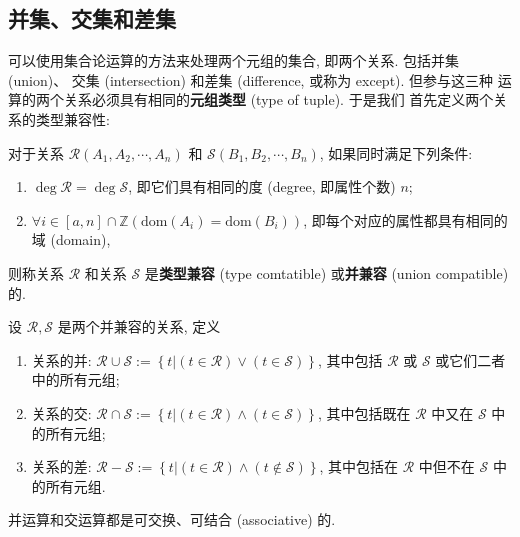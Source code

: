 \documentclass[10pt,UTF8]{book} %
\begin{document}
\subsection{并集、交集和差集}

可以使用集合论运算的方法来处理两个元组的集合, 即两个关系. 包括并集 (union)、
交集 (intersection) 和差集 (difference, 或称为 except). 但参与这三种
运算的两个关系必须具有相同的\textbf{元组类型} (type of tuple). 于是我们
首先定义两个关系的类型兼容性:

\begin{definition}
    对于关系 $\mathcal{R}(A_1, A_2, \cdots, A_n)$ 和 $\mathcal{S}
    (B_1, B_2, \cdots, B_n)$, 如果同时满足下列条件:
    \begin{enumerate}[label={${\arabic*}^\circ$}, itemsep=0pt]
        \item $\deg \mathcal{R} = \deg \mathcal{S}$, 
        即它们具有相同的度 (degree, 即属性个数) $n$;
        \item $\forall i \in [a,n]\cap\mathbb{Z}\left(
            \mathrm{dom}(A_i) = \mathrm{dom}(B_i)
        \right)$, 即每个对应的属性都具有相同的域 (domain),
    \end{enumerate}
    则称关系 $\mathcal{R}$ 和关系 $\mathcal{S}$ 是\textbf{类型兼容}
    (type comtatible) 或\textbf{并兼容} (union compatible) 的.
\end{definition}

\begin{definition}
    设 $\mathcal{R}, \mathcal{S}$ 是两个并兼容的关系, 定义
    \begin{enumerate}[label={${\arabic*}^\circ$}, itemsep=0pt]
        \item 关系的并: $\mathcal{R} \cup \mathcal{S} := \left\{
            t | (t \in \mathcal{R}) \vee (t \in \mathcal{S})
        \right\}$, 其中包括 $\mathcal{R}$ 或 $\mathcal{S}$ 或它们二者
        中的所有元组;
        \item 关系的交: $\mathcal{R} \cap \mathcal{S} := \left\{
            t | (t \in \mathcal{R}) \wedge (t \in \mathcal{S})
        \right\}$, 其中包括既在 $\mathcal{R}$ 中又在 $\mathcal{S}$
        中的所有元组;
        \item 关系的差: $\mathcal{R} - \mathcal{S} := \left\{
            t | (t \in \mathcal{R}) \wedge (t \notin \mathcal{S})
        \right\}$, 其中包括在 $\mathcal{R}$ 中但不在 $\mathcal{S}$
        中的所有元组.
    \end{enumerate}
\end{definition}
\begin{remark}
    并运算和交运算都是可交换、可结合 (associative) 的.
\end{remark}
\end{document}
